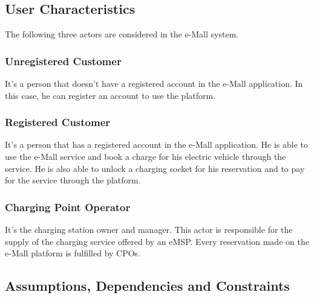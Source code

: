 \subsection{User Characteristics}
The following three actors are considered in the e-Mall system.
\subsubsection{Unregistered Customer}
It's a person that doesn't have a registered account in the e-Mall application. 
In this case, he can register an account to use the platform.
\subsubsection{Registered Customer}
It's a person that has a registered account in the e-Mall application. 
He is able to use the e-Mall service and book a charge for his electric vehicle through the service.
He is also able to unlock a charging socket for his reservation and to pay for the service through the platform.
\subsubsection{Charging Point Operator}
It's the charging station owner and manager. This actor is responsible for the supply of the charging service offered by an eMSP. 
Every reservation made on the e-Mall platform is fulfilled by CPOs.
\subsection{Assumptions, Dependencies and Constraints}
